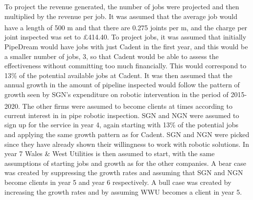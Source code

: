 \documentclass[11pt]{article}		%
\newcommand{\supercite}[1]{\textsuperscript{\cite{#1}}}		%
\begin{document}
    To project the revenue generated, the number of jobs were projected and then multiplied by the revenue per job. It was assumed that the average job would have a length of 500 m and that there are 0.275 joints per m\supercite{SGN_Southern}, and the charge per joint inspected was set to £414.40.
    To project jobs, it was assumed that initially PipeDream would have jobs with just Cadent in the first year, and this would be a smaller number of jobs, 3, so that  Cadent would be able to assess the effectiveness without committing too much financially. This would correspond to 13\% of the potential available jobs at Cadent. It was then assumed  that the annual growth in the amount of pipeline inspected would follow the pattern of growth seen by SGN’s expenditure on robotic intervention in the period of 2015-2020\supercite{SGN_Southern}.
    The other firms were assumed to become clients at times according to current interest in in pipe robotic inspection. SGN and NGN were assumed to sign up for the service in year 4, again starting with 13\% of the potential jobs and applying the same growth pattern as for Cadent. SGN and NGN were picked since they have already shown their willingness to work with robotic solutions. In year 7 Wales \& West Utilities is then assumed to start, with the same assumptions of starting jobs and growth as for the other companies. A bear case was created by suppressing the growth rates and assuming that SGN and NGN become clients in year 5 and year 6 respectively. A bull case was created by increasing the growth rates and by assuming WWU becomes a client in year 5.
    \\ 
\end{document}
